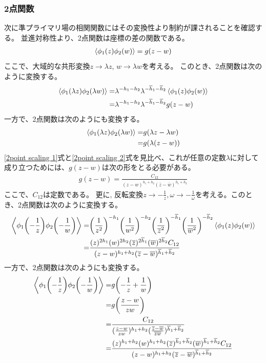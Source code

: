 \documentclass[11pt, dvipdfmx]{article}
\numberwithin{equation}{section}
\begin{document}
\subsubsection{2点関数}
次に準プライマリ場の相関関数にはその変換性より制約が課されることを確認する。
並進対称性より、2点関数は座標の差の関数である。
\begin{align}
    \ev{\phi_1(z)\phi_2(w)}=g(z-w)
\end{align}
ここで、大域的な共形変換$z\rightarrow \lambda z$, $w\rightarrow \lambda w$を考える。
このとき、2点関数は次のように変換する。
\begin{align}
    \ev{\phi_1(\lambda z)\phi_2(\lambda w)}=&\lambda^{-h_1 - h_2}\lambda^{-\overline{h}_1 - \overline{h}_2}\ev{\phi_1(z)\phi_2(w)}\\
    =&\lambda^{-h_1 - h_2}\lambda^{-\overline{h}_1 - \overline{h}_2}g(z-w)\label{2point scaling 1}
\end{align}
一方で、2点関数は次のようにも変換する。
\begin{align}
    \ev{\phi_1(\lambda z)\phi_2(\lambda w)}=&g(\lambda z - \lambda w)\\
    =&g(\lambda (z-w))\label{2point scaling 2}
\end{align}
\eqref{2point scaling 1}式と\eqref{2point scaling 2}式を見比べ、これが任意の定数$\lambda$に対して成り立つためには、$g(z-w)$は次の形をとる必要がある。
\begin{align}
    g(z-w)=\frac{C_{12}}{(z-w)^{h_1 + h_2}(\overline{z}-\overline{w})^{\overline{h}_1 + \overline{h}_2}}
\end{align}
ここで、$C_{12}$は定数である。
更に,
反転変換$z\rightarrow -\frac{1}{z},\omega\rightarrow -\frac{1}{\omega}$を考える。このとき、2点関数は次のように変換する。
\begin{align}
    \ev{\phi_1\qty(-\frac{1}{z})\phi_2\qty(-\frac{1}{w})}=&\qty(\frac{1}{z^2})^{-h_1}\qty(\frac{1}{w^2})^{-h_2}\qty(\frac{1}{\overline{z}^2})^{-\overline{h}_1}\qty(\frac{1}{\overline{w}^2})^{-\overline{h}_2}\ev{\phi_1(z)\phi_2(w)}\\
    =&\frac{(z)^{2h_1}(w)^{2h_2}(\overline{z})^{2\overline{h}_1}(\overline{w})^{2\overline{h}_2}C_{12}}{(z-w)^{h_1 + h_2}(\overline{z}-\overline{w})^{\overline{h}_1 + \overline{h}_2}}\label{2point inversion 1}
\end{align}
一方で、2点関数は次のようにも変換する。
\begin{align}
    \ev{\phi_1\qty(-\frac{1}{z})\phi_2\qty(-\frac{1}{w})}=&g\qty(-\frac{1}{z} + \frac{1}{w})\\
    =&g\qty(\frac{z-w}{zw})\\
    =&\frac{C_{12}}{(\frac{z-w}{zw})^{h_1 + h_2}(\frac{\overline{z}-\overline{w}}{\overline{z}\overline{w}})^{\overline{h}_1 + \overline{h}_2}}\\
    =&\frac{(z)^{h_1 + h_2}(w)^{h_1 + h_2}(\overline{z})^{\overline{h}_1 + \overline{h}_2}(\overline{w})^{\overline{h}_1 + \overline{h}_2}C_{12}}{(z-w)^{h_1 + h_2}(\overline{z}-\overline{w})^{\overline{h}_1 + \overline{h}_2}}\label{2point inversion 2}
\end{align}
\end{document}
